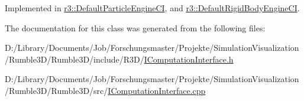 Implemented in \mbox{\hyperlink{classr3_1_1_default_particle_engine_c_i_a7c58fd00ec521410e1b412e9885ee0d2}{r3\+::\+Default\+Particle\+Engine\+CI}}, and \mbox{\hyperlink{classr3_1_1_default_rigid_body_engine_c_i_ac45ae1d1889c75e6839b865870cbf59c}{r3\+::\+Default\+Rigid\+Body\+Engine\+CI}}.



The documentation for this class was generated from the following files\+:\begin{DoxyCompactItemize}
\item 
D\+:/\+Library/\+Documents/\+Job/\+Forschungsmaster/\+Projekte/\+Simulation\+Visualization/\+Rumble3\+D/\+Rumble3\+D/include/\+R3\+D/\mbox{\hyperlink{_i_computation_interface_8h}{I\+Computation\+Interface.\+h}}\item 
D\+:/\+Library/\+Documents/\+Job/\+Forschungsmaster/\+Projekte/\+Simulation\+Visualization/\+Rumble3\+D/\+Rumble3\+D/src/\mbox{\hyperlink{_i_computation_interface_8cpp}{I\+Computation\+Interface.\+cpp}}\end{DoxyCompactItemize}
